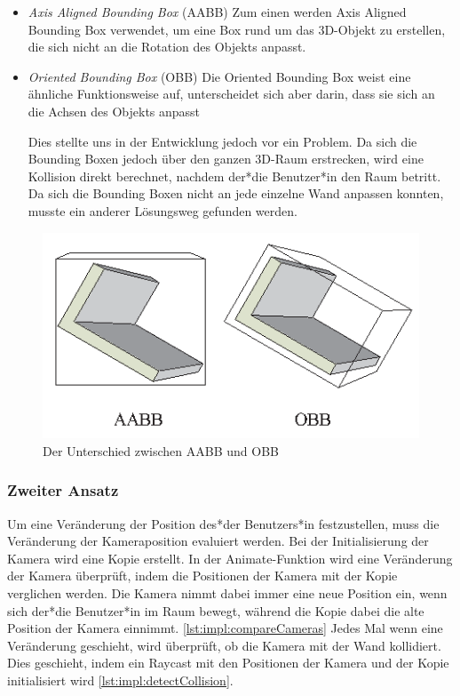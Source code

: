 \begin{itemize}
    \item \emph{Axis Aligned Bounding Box} (AABB)
    \newline
    Zum einen werden Axis Aligned Bounding Box verwendet, um eine Box rund um das 3D-Objekt zu erstellen, die sich nicht an die Rotation des Objekts anpasst.
    \item \emph{Oriented Bounding Box} (OBB)
    \newline
    Die Oriented Bounding Box weist eine ähnliche Funktionsweise auf, unterscheidet sich aber darin, dass sie sich an die Achsen des Objekts anpasst
    
    Dies stellte uns in der Entwicklung jedoch vor ein Problem. Da sich die Bounding Boxen jedoch über den ganzen 3D-Raum erstrecken, wird eine Kollision direkt berechnet, nachdem der*die Benutzer*in den Raum betritt. Da sich die Bounding Boxen nicht an jede einzelne Wand anpassen konnten, musste ein anderer Lösungsweg gefunden werden.
\end{itemize}

\begin{figure} [h t]
    \centering
    \includegraphics[scale=0.65]{pics/aabb_obb.png}
    \caption{Der Unterschied zwischen AABB und OBB \cite{AABBandOBBPicture}}
    \label{fig:impl:aabb_obb}
\end{figure}


\subsubsection{Zweiter Ansatz}
Um eine Veränderung der Position des*der Benutzers*in festzustellen, muss die Veränderung der Kameraposition evaluiert werden. Bei der Initialisierung der Kamera wird eine Kopie erstellt. In der Animate-Funktion wird eine Veränderung der Kamera überprüft, indem die Positionen der Kamera mit der Kopie verglichen werden. Die Kamera nimmt dabei immer eine neue Position ein, wenn sich der*die Benutzer*in im Raum bewegt, während die Kopie dabei die alte Position der Kamera einnimmt. \ref{lst:impl:compareCameras} Jedes Mal wenn eine Veränderung geschieht, wird überprüft, ob die Kamera mit der Wand kollidiert. Dies geschieht, indem ein Raycast mit den Positionen der Kamera und der Kopie initialisiert wird \ref{lst:impl:detectCollision}. 
     

